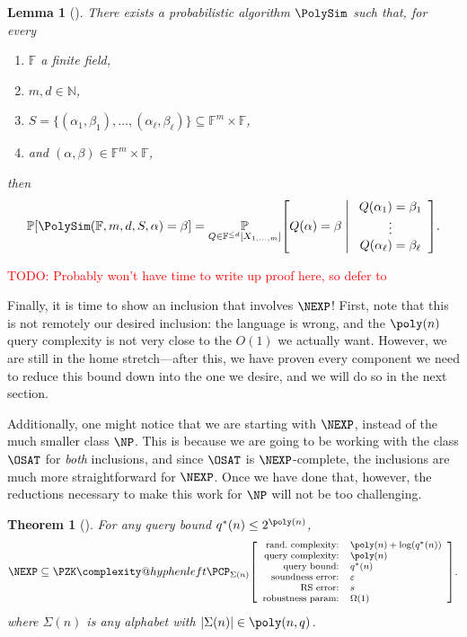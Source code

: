 \documentclass[english,12pt]{reedthesis}
\makeatletter
\theoremstyle{plain}
\newtheorem{thm}{Theorem}[section]
\newtheorem{lemma}[lemma]{Lemma}
\theoremstyle{definition}
\theoremstyle{remark}
\DeclarePairedDelimiter{\abs}{\lvert}{\rvert}
\newcommand{\middlemid}{%
  \ensuremath{\;\middle\vert\;}
}
\newcommand{\pzkpcpr}[6]{%
  \ensuremath%
  \mleft[{\footnotesize\begin{array}{r l}
    \text{rand.\ complexity:} & #1 \\
    \text{query complexity:} & #2 \\
    \text{query bound:} & #3 \\
    \text{soundness error:} & #4 \\
    \text{RS error:} & #5 \\
    \text{robustness param:} & #6
  \end{array}}\mright]%
}
\newcommand{\PZKPCP}{%
  \PZK\complexity@hyphenleft\PCP
}
\newcommand{\TODO}[1]{\textcolor{red}{TODO: #1}}
\makeatother
\begin{document}
\begin{lemma}[{\cite[Corollary 4.10]{BCFGRS17}}]\label{lem:polysim}
  There exists a probabilistic algorithm $\PolySim$ such that, for every
  \begin{enumerate}
    \item $\mathbb{F}$ a finite field,
    \item $m, d \in \mathbb{N}$,
    \item $S = \{(\alpha_{1}, \beta_{1}), \ldots, (\alpha_{\ell}, \beta_{\ell})\} \subseteq \mathbb{F}^{m} \times \mathbb{F}$,
    \item and $(\alpha, \beta) \in \mathbb{F}^{m} \times \mathbb{F}$,
  \end{enumerate}
  then
  \begin{equation}
    \mathbb{P}\mleft[\PolySim(\mathbb{F}, m, d, S, \alpha) = \beta\mright]
    = \underset{Q \in \mathbb{F}^{\le d}[X_{1, \ldots, m}]}{\mathbb{P}}\mleft[
      Q(\alpha) = \beta \middlemid
      \begin{array}{c}
        Q(\alpha_{1}) = \beta_{1} \\
        \vdots \\
        Q(\alpha_{\ell}) = \beta_{\ell}
      \end{array}
    \mright].
  \end{equation}
\end{lemma}

\TODO{Probably won't have time to write up proof here, so defer to
  \cite{BCFGRS17}}

Finally, it is time to show an inclusion that involves $\NEXP$! First, note that
this is not remotely our desired inclusion: the language is wrong, and the
$\poly(n)$ query complexity is not very close to the $O(1)$ we actually want.
However, we are still in the home stretch---after this, we have proven every
component we need to reduce this bound down into the one we desire, and we will
do so in the next section.

Additionally, one might notice that we are starting with $\NEXP$, instead of the
much smaller class $\NP$. This is because we are going to be working with the
class $\OSAT$ for \emph{both} inclusions, and since $\OSAT$ is $\NEXP$-complete,
the inclusions are much more straightforward for $\NEXP$. Once we have done
that, however, the reductions necessary to make this work for $\NP$ will not
be too challenging.

\begin{thm}[{\cite[Theorem 6.3]{GOS25}}]\label{thm:nexp-zk-pcp}
  For any query bound $q^{*}(n) \le 2^{\poly(n)}$,
  \[
    \NEXP \subseteq
    \PZKPCP_{\Sigma(n)}\pzkpcpr{\poly(n)+\log(q^{*}(n))}{\poly(n)}{q^{*}(n)}{\varepsilon}{s}{\Omega(1)}.
  \]
  where $\Sigma(n)$ is any alphabet with $\abs{\Sigma(n)} \in \poly(n, q)$.
\end{thm}
\end{document}
